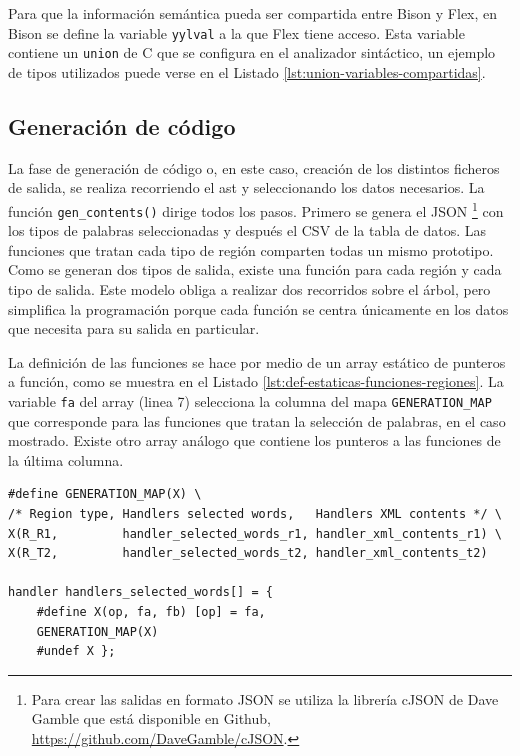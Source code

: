 Para que la información semántica pueda ser compartida entre Bison y Flex, en Bison se define la variable \verb|yylval| a la que Flex tiene acceso. Esta variable contiene un \verb|union| de C que se configura en el analizador sintáctico, un ejemplo de tipos utilizados puede verse en el Listado \ref{lst:union-variables-compartidas}.

\subsection{Generación de código}

La fase de generación de código o, en este caso, creación de los distintos ficheros de salida, se realiza recorriendo el \acrshort{ast} y seleccionando los datos necesarios. La función \verb|gen_contents()| dirige todos los pasos. Primero se genera el JSON \footnote{Para crear las salidas en formato JSON se utiliza la librería cJSON de Dave Gamble que está disponible en Github, \url{https://github.com/DaveGamble/cJSON}.} con los tipos de palabras seleccionadas y después el CSV de la tabla de datos. Las funciones que tratan cada tipo de región comparten todas un mismo prototipo. Como se generan dos tipos de salida, existe una función para cada región y cada tipo de salida. Este modelo obliga a realizar dos recorridos sobre el árbol, pero simplifica la programación porque cada función se centra únicamente en los datos que necesita para su salida en particular.

La definición de las funciones se hace por medio de un array estático de punteros a función, como se muestra en el Listado \ref{lst:def-estaticas-funciones-regiones}. La variable \verb|fa| del array (linea 7) selecciona la columna del mapa \verb|GENERATION_MAP| que corresponde para las funciones que tratan la selección de palabras, en el caso mostrado. Existe otro array análogo que contiene los punteros a las funciones de la última columna.

\begin{lstlisting}[caption={Definiciones estáticas para las funciones que tratan las regiones},label={lst:def-estaticas-funciones-regiones}]
#define GENERATION_MAP(X) \
/* Region type, Handlers selected words,   Handlers XML contents */ \
X(R_R1,         handler_selected_words_r1, handler_xml_contents_r1) \
X(R_T2,         handler_selected_words_t2, handler_xml_contents_t2)

handler handlers_selected_words[] = {
    #define X(op, fa, fb) [op] = fa,
    GENERATION_MAP(X)
    #undef X };
\end{lstlisting}

